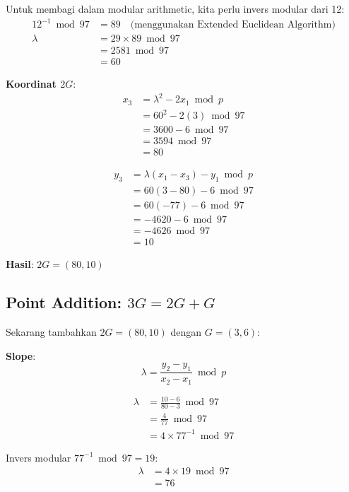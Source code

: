 Untuk membagi dalam modular arithmetic, kita perlu invers modular dari 12:
\begin{align*}
12^{-1} \bmod 97 &= 89 \quad \text{(menggunakan Extended Euclidean Algorithm)} \\
\lambda &= 29 \times 89 \bmod 97 \\
        &= 2581 \bmod 97 \\
        &= 60
\end{align*}

\textbf{Koordinat $2G$}:
\begin{align*}
x_3 &= \lambda^2 - 2x_1 \bmod p \\
    &= 60^2 - 2(3) \bmod 97 \\
    &= 3600 - 6 \bmod 97 \\
    &= 3594 \bmod 97 \\
    &= 80
\end{align*}

\begin{align*}
y_3 &= \lambda(x_1 - x_3) - y_1 \bmod p \\
    &= 60(3 - 80) - 6 \bmod 97 \\
    &= 60(-77) - 6 \bmod 97 \\
    &= -4620 - 6 \bmod 97 \\
    &= -4626 \bmod 97 \\
    &= 10
\end{align*}

\textbf{Hasil}: $2G = (80, 10)$

\subsection{Point Addition: \texorpdfstring{$3G = 2G + G$}{3G = 2G + G}}

Sekarang tambahkan $2G = (80, 10)$ dengan $G = (3, 6)$:

\textbf{Slope}:
\[
\lambda = \frac{y_2 - y_1}{x_2 - x_1} \bmod p
\]

\begin{align*}
\lambda &= \frac{10 - 6}{80 - 3} \bmod 97 \\
        &= \frac{4}{77} \bmod 97 \\
        &= 4 \times 77^{-1} \bmod 97
\end{align*}

Invers modular $77^{-1} \bmod 97 = 19$:
\begin{align*}
\lambda &= 4 \times 19 \bmod 97 \\
        &= 76
\end{align*}

